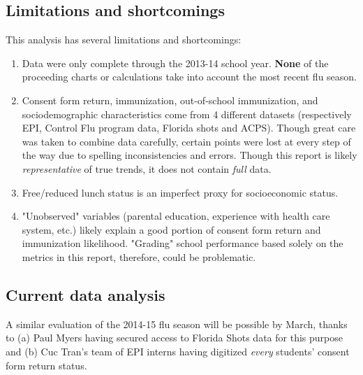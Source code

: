 \documentclass{article}
\begin{document}
\subsection*{Limitations and shortcomings}
This analysis has several limitations and shortcomings: \begin{enumerate}
\item Data were only complete through the 2013-14 school year.  \textbf{None} of the proceeding charts or calculations take into account the most recent flu season.
\item Consent form return, immunization, out-of-school immunization, and sociodemographic characteristics come from 4 different datasets (respectively EPI, Control Flu program data, Florida shots and ACPS).  Though great care was taken to combine data carefully, certain points were lost at every step of the way due to spelling inconsistencies and errors.  Though this report is likely \emph{representative} of true trends, it does not contain \emph{full} data.
\item Free/reduced lunch status is an imperfect proxy for socioeconomic status.
\item "Unobserved" variables (parental education, experience with health care system, etc.) likely explain a good portion of consent form return and immunization likelihood. "Grading" school performance based solely on the metrics in this report, therefore, could be problematic.  
\end{enumerate}

\subsection*{Current data analysis}
A similar evaluation of the 2014-15 flu season will be possible by March, thanks to (a) Paul Myers having secured access to Florida Shots data for this purpose and (b) Cuc Tran's team of EPI interns having digitized \emph{every} students' consent form return status.
\end{document}
